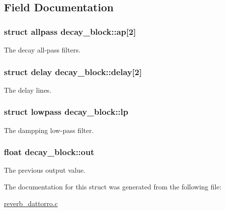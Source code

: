 \subsection{Field Documentation}
\hypertarget{structdecay__block_a3f47e2dbc49bfba0a48954341342fea5}{
\subsubsection[{ap}]{\setlength{\rightskip}{0pt plus 5cm}struct {\bf allpass} decay\-\_\-block\-::ap\mbox{[}2\mbox{]}}}\label{structdecay__block_a3f47e2dbc49bfba0a48954341342fea5}
The decay all-\/pass filters. \hypertarget{structdecay__block_a954ff93051d7dfe61d76f24270618dc8}{
\subsubsection[{delay}]{\setlength{\rightskip}{0pt plus 5cm}struct {\bf delay} decay\-\_\-block\-::delay\mbox{[}2\mbox{]}}}\label{structdecay__block_a954ff93051d7dfe61d76f24270618dc8}
The delay lines. \hypertarget{structdecay__block_abe3a5f9a9c4bbb4873364861dfd2e1c6}{
\subsubsection[{lp}]{\setlength{\rightskip}{0pt plus 5cm}struct {\bf lowpass} decay\-\_\-block\-::lp}}\label{structdecay__block_abe3a5f9a9c4bbb4873364861dfd2e1c6}
The dampping low-\/pass filter. \hypertarget{structdecay__block_ab25f987c34d1ec2d9cf019fc758bc196}{
\subsubsection[{out}]{\setlength{\rightskip}{0pt plus 5cm}float decay\-\_\-block\-::out}}\label{structdecay__block_ab25f987c34d1ec2d9cf019fc758bc196}
The previous output value. 

The documentation for this struct was generated from the following file\-:\begin{DoxyCompactItemize}
\item 
\hyperlink{reverb__dattorro_8c}{reverb\-\_\-dattorro.\-c}\end{DoxyCompactItemize}
